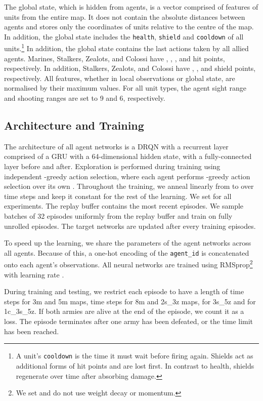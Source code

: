 \documentclass{article}
\begin{document}
The global state, which is hidden from agents, is a vector comprised of features of units from the entire map. It does not contain the absolute distances between agents and stores only the coordinates of units relative to the centre of the map. In addition, the global state includes the \texttt{health}, \texttt{shield} and \texttt{cooldown} of all units.\footnote{A unit's \texttt{cooldown} is the time it must wait before firing again. Shields act as additional forms of hit points and are lost first. In contrast to health, shields regenerate over time after absorbing damage.} In addition, the global state contains the last actions taken by all allied agents. Marines, Stalkers, Zealots, and Colossi have , , , and  hit points, respectively. In addition, Stalkers, Zealots, and Colossi have , , and  shield points, respectively. All features, whether in local observations or global state, are normalised by their maximum values. For all unit types, the agent sight range and shooting ranges are set to 9 and 6, respectively.


\subsection{Architecture and Training}

The architecture of all agent networks is a DRQN with a recurrent layer 
comprised of a GRU with a 64-dimensional hidden state, with a fully-connected 
layer before and after.
Exploration is performed during training using independent -greedy action selection, where each agent  performs -greedy action selection over its own . 
Throughout the training, we anneal  linearly from  to  over  time steps and keep it constant for the rest of the learning. 
We set  for all experiments.
The replay buffer contains the most recent  episodes.  
We sample batches of 32 episodes uniformly from the replay buffer and train on fully unrolled episodes.
The target networks are updated after every  training episodes.

To speed up the learning, we share the parameters of the agent networks across all agents. 
Because of this, a one-hot encoding of the \texttt{agent\_id} is concatenated onto each agent's observations. 
All neural networks are trained using RMSprop\footnote{We set  and do not use weight decay or momentum.} with learning rate . 

During training and testing, we restrict each episode to have a length of  time steps for 3m and 5m maps,  time steps for 8m and 2s\_3z maps,  for 3s\_5z and  for 1c\_3s\_5z. If both armies are alive at the end of the episode, we count it as a loss. The episode terminates after one army has been defeated, or the time limit has been reached. 
\end{document}
